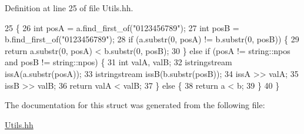 Definition at line 25 of file Utils.\+hh.


\begin{DoxyCode}
25                                                           \{
26             \textcolor{keywordtype}{int} posA = a.find\_first\_of(\textcolor{stringliteral}{"0123456789"});
27             \textcolor{keywordtype}{int} posB = b.find\_first\_of(\textcolor{stringliteral}{"0123456789"});
28             \textcolor{keywordflow}{if} (a.substr(0, posA) != b.substr(0, posB)) \{
29                 \textcolor{keywordflow}{return} a.substr(0, posA) < b.substr(0, posB);
30             \} \textcolor{keywordflow}{else} \textcolor{keywordflow}{if} (posA != string::npos and posB != string::npos) \{
31                 \textcolor{keywordtype}{int} valA, valB;
32                 istringstream issA(a.substr(posA));
33                 istringstream issB(b.substr(posB));
34                 issA >> valA;
35                 issB >> valB;
36                 \textcolor{keywordflow}{return} valA < valB;
37             \} \textcolor{keywordflow}{else} \{
38                 \textcolor{keywordflow}{return} a < b;
39             \}
40         \}
\end{DoxyCode}


The documentation for this struct was generated from the following file\+:\begin{DoxyCompactItemize}
\item 
\hyperlink{_utils_8hh}{Utils.\+hh}\end{DoxyCompactItemize}
